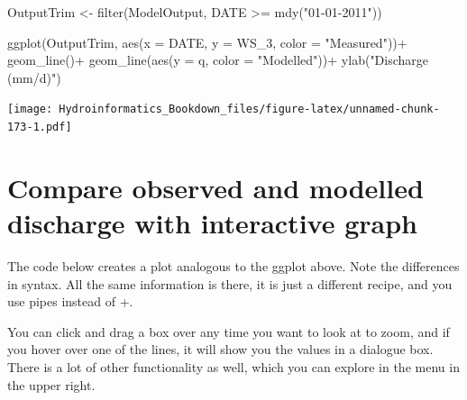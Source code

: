 \documentclass[
]{book}
\newenvironment{Shaded}{\begin{snugshade}}{\end{snugshade}}
\newcommand{\AttributeTok}[1]{\textcolor[rgb]{0.77,0.63,0.00}{#1}}
\newcommand{\FunctionTok}[1]{\textcolor[rgb]{0.00,0.00,0.00}{#1}}
\newcommand{\NormalTok}[1]{#1}
\newcommand{\OtherTok}[1]{\textcolor[rgb]{0.56,0.35,0.01}{#1}}
\newcommand{\SpecialCharTok}[1]{\textcolor[rgb]{0.00,0.00,0.00}{#1}}
\newcommand{\StringTok}[1]{\textcolor[rgb]{0.31,0.60,0.02}{#1}}
\begin{document}
\begin{Shaded}
\begin{Highlighting}[]
\NormalTok{OutputTrim }\OtherTok{\textless{}{-}} \FunctionTok{filter}\NormalTok{(ModelOutput, DATE }\SpecialCharTok{\textgreater{}=} \FunctionTok{mdy}\NormalTok{(}\StringTok{"01{-}01{-}2011"}\NormalTok{))}

\FunctionTok{ggplot}\NormalTok{(OutputTrim, }\FunctionTok{aes}\NormalTok{(}\AttributeTok{x =}\NormalTok{ DATE, }\AttributeTok{y =}\NormalTok{ WS\_3, }\AttributeTok{color =} \StringTok{"Measured"}\NormalTok{))}\SpecialCharTok{+}
  \FunctionTok{geom\_line}\NormalTok{()}\SpecialCharTok{+}
  \FunctionTok{geom\_line}\NormalTok{(}\FunctionTok{aes}\NormalTok{(}\AttributeTok{y =}\NormalTok{ q, }\AttributeTok{color =} \StringTok{"Modelled"}\NormalTok{))}\SpecialCharTok{+}
  \FunctionTok{ylab}\NormalTok{(}\StringTok{"Discharge (mm/d)"}\NormalTok{)}
\end{Highlighting}
\end{Shaded}

\texttt{[image: Hydroinformatics\_Bookdown\_files/figure-latex/unnamed-chunk-173-1.pdf]}

\hypertarget{compare-observed-and-modelled-discharge-with-interactive-graph}{%
\section{Compare observed and modelled discharge with interactive graph}\label{compare-observed-and-modelled-discharge-with-interactive-graph}}

The code below creates a plot analogous to the ggplot above. Note the differences in syntax. All the same information is there, it is just a different recipe, and you use pipes instead of +.

You can click and drag a box over any time you want to look at to zoom, and if you hover over one of the lines, it will show you the values in a dialogue box. There is a lot of other functionality as well, which you can explore in the menu in the upper right.
\end{document}

